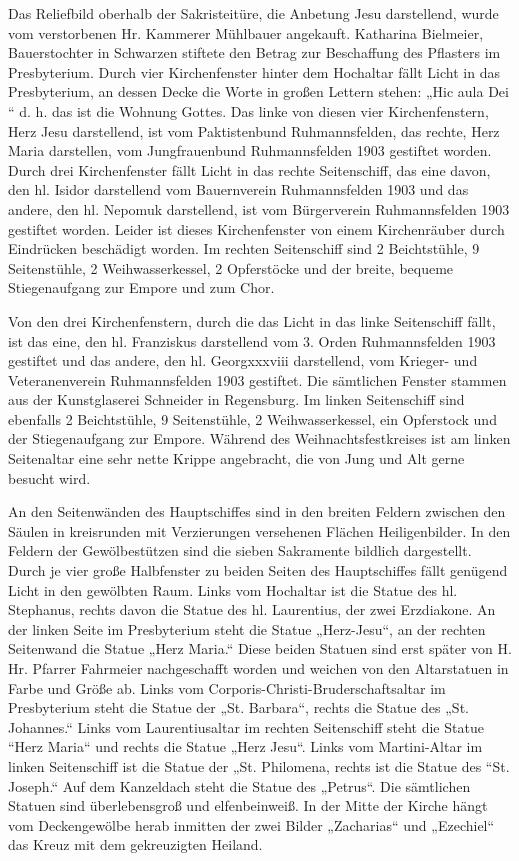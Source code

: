 \documentclass[12pt,a4paper]{book}
\begin{document}
Das Reliefbild oberhalb der Sakristeitüre, die Anbetung Jesu darstellend, wurde
vom verstorbenen Hr. Kammerer Mühlbauer angekauft. Katharina Bielmeier,
Bauerstochter in Schwarzen stiftete den Betrag zur Beschaffung des Pflasters im
Presbyterium. Durch vier Kirchenfenster hinter dem Hochaltar fällt Licht in das
Presbyterium, an dessen Decke die Worte in großen Lettern stehen: „Hic aula Dei
“ d. h. das ist die Wohnung Gottes. Das linke von diesen vier Kirchenfenstern,
Herz Jesu darstellend, ist vom Paktistenbund Ruhmannsfelden, das rechte, Herz
Maria darstellen, vom Jungfrauenbund Ruhmannsfelden 1903 gestiftet worden. Durch
drei Kirchenfenster fällt Licht in das rechte Seitenschiff, das eine davon, den
hl. Isidor darstellend vom Bauernverein Ruhmannsfelden 1903 und das andere, den
hl. Nepomuk darstellend, ist vom Bürgerverein Ruhmannsfelden 1903 gestiftet
worden. Leider ist dieses Kirchenfenster von einem Kirchenräuber durch
Eindrücken beschädigt worden. Im rechten Seitenschiff sind 2 Beichtstühle, 9
Seitenstühle, 2 Weihwasserkessel, 2 Opferstöcke und der breite, bequeme
Stiegenaufgang zur Empore und zum Chor.

Von den drei Kirchenfenstern, durch die das Licht in das linke Seitenschiff
fällt, ist das eine, den hl. Franziskus darstellend vom 3. Orden Ruhmannsfelden
1903 gestiftet und das andere, den hl. Georgxxxviii darstellend, vom Krieger-
und Veteranenverein Ruhmannsfelden 1903 gestiftet. Die sämtlichen Fenster
stammen aus der Kunstglaserei Schneider in Regensburg. Im linken Seitenschiff
sind ebenfalls 2 Beichtstühle, 9 Seitenstühle, 2 Weihwasserkessel, ein
Opferstock und der Stiegenaufgang zur Empore. Während des Weihnachtsfestkreises
ist am linken Seitenaltar eine sehr nette Krippe angebracht, die von Jung und
Alt gerne besucht wird.

An den Seitenwänden des Hauptschiffes sind in den breiten Feldern zwischen den
Säulen in kreisrunden mit Verzierungen versehenen Flächen Heiligenbilder. In den
Feldern der Gewölbestützen sind die sieben Sakramente bildlich dargestellt.
Durch je vier große Halbfenster zu beiden Seiten des Hauptschiffes fällt
genügend Licht in den gewölbten Raum. Links vom Hochaltar ist die Statue des hl.
Stephanus, rechts davon die Statue des hl. Laurentius, der zwei Erzdiakone. An
der linken Seite im Presbyterium steht die Statue „Herz-Jesu“, an der rechten
Seitenwand die Statue „Herz Maria.“ Diese beiden Statuen sind erst später von H.
Hr. Pfarrer Fahrmeier nachgeschafft worden und weichen von den Altarstatuen in
Farbe und Größe ab. Links vom Corporis-Christi-Bruderschaftsaltar im
Presbyterium steht die Statue der „St. Barbara“, rechts die Statue des „St.
Johannes.“ Links vom Laurentiusaltar im rechten Seitenschiff steht die Statue
“Herz Maria“ und rechts die Statue „Herz Jesu“. Links vom Martini-Altar im
linken Seitenschiff ist die Statue der „St. Philomena, rechts ist die Statue des
“St. Joseph.“ Auf dem Kanzeldach steht die Statue des „Petrus“. Die sämtlichen
Statuen sind überlebensgroß und elfenbeinweiß. In der Mitte der Kirche hängt vom
Deckengewölbe herab inmitten der zwei Bilder „Zacharias“ und „Ezechiel“ das
Kreuz mit dem gekreuzigten Heiland.
\end{document}

